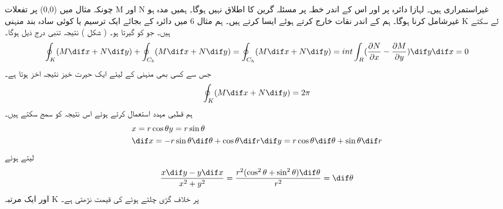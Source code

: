 چونکہ مثال      میں  (0,0) پر تفعلات M اور N غیراستمراری ہیں۔ لہازا دائرہ  پر اور اس کے اندر خطہ پر مسئلہ گرین کا اطلاق نہیں ہوگا۔ ہمیں مدہ ہو غیرشامل کرنا ہوگا۔  ہم   کے اندر نقات خارج کرتے ہوئے ایسا کرتے ہیں۔  ہم مثال  6 میں دائرہ  کے بجائے ایک ترسیم یا کوئی سادہ بند منہنی  K لے سکتے ہیں۔ جو   کو گیرتا ہو۔  ( شکل    ) نتیجہ تنبی درج ذیل ہوگا۔  
\begin{align*}
     \oint_K ( M \dif x + N \dif y ) + \oint_{C_b} ( M \dif x + N \dif y) = \oint_{C_h} (M \dif x + N \dif y) = int \int_R (\frac{\partial N}{\partial x} - \frac{\partial M}{\partial y}) \dif y \dif x = 0 
\end{align*}
 جس سے کسی بھی منہنی  کے لیئے ایک حیرت خیز نتیجہ اخز ہوتا ہے۔ 
\begin{align*}
     \oint_K ( M \dif x + N \dif y ) = 2 \pi 
\end{align*}
 ہم قطبی مہدد استعمال کرتے ہوئے اس نتیجہ کو سمج سکتے ہیں۔  
\begin{align*}
    & x = r\cos{\theta} \vspace{2cm} y = r\sin{\theta}\\    & \dif x = -r \sin{\theta} \dif \theta + \cos{\theta} \dif r \vspace{2cm} \dif y = r \cos{\theta} \dif \theta + \sin{\theta} \dif r 
\end{align*}
 لیتے ہوئے 
\begin{align}
  \frac{x \dif y - y\dif x}{x^2 + y^2} = \frac{r^2( \cos^2{\theta} + \sin^2{\theta}) \dif \theta}{r^2} = \dif \theta    
\end{align}
 اور ایک مرتبہ  K پر خلاف گڑی چلتے ہوئے   کی قیمت   نڑھتی ہے۔
